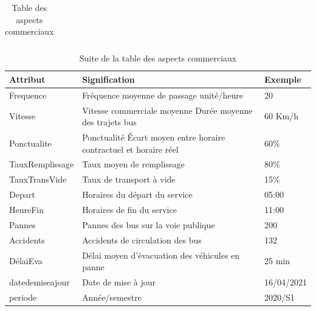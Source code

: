 \documentclass[a4paper]{report}
\begin{document}
\begin{doublespace}
\begin{table}[H]
\begin{center}
\begin{tabularx}{17.5cm}{|p{4cm}|X|p{2cm}|}
				\hline
			\end{tabularx}
			\caption{Table des aspects commerciaux}
		\end{center}
	\end{table}
	\begin{table}[H]
		\begin{center}
			\begin{tabularx}{17.5cm}{|p{4cm}|X|p{2cm}|}
				\hline
				\textbf{Attribut} & \textbf{Signification}                                            & \textbf{Exemple} \\
				\hline
				Frequence         & Fréquence moyenne de passage unité/heure                          & 20               \\
				\hline
				Vitesse           & Vitesse commerciale moyenne Durée moyenne des trajets bus         & 60 Km/h          \\
				\hline
				Ponctualite       & Ponctualité Écart moyen entre horaire contractuel et horaire réel & 60\%             \\
				\hline
				TauxRemplissage   & Taux moyen de remplissage                                         & 80\%             \\
				\hline
				TauxTransVide     & Taux de transport à vide                                          & 15\%             \\
				\hline
				Depart            & Horaires du départ du service                                     & 05:00            \\
				\hline
				HeureFin          & Horaires de fin du service                                        & 11:00            \\
				\hline
				Pannes            & Pannes des bus sur la voie publique                               & 200              \\
				\hline
				Accidents         & Accidents de circulation des bus                                  & 132              \\
				\hline
				DélaiEva          & Délai moyen d'évacuation des véhicules en panne                   & 25 min           \\
				\hline
				datedemiseajour   & Date de mise à jour                                               & 16/04/2021       \\
				\hline
				periode           & Année/semestre                                                    & 2020/S1          \\
				\hline
			\end{tabularx}
			\caption{Suite de la table des aspects commerciaux}
		\end{center}
	\end{table}


\end{doublespace}
\end{document}
